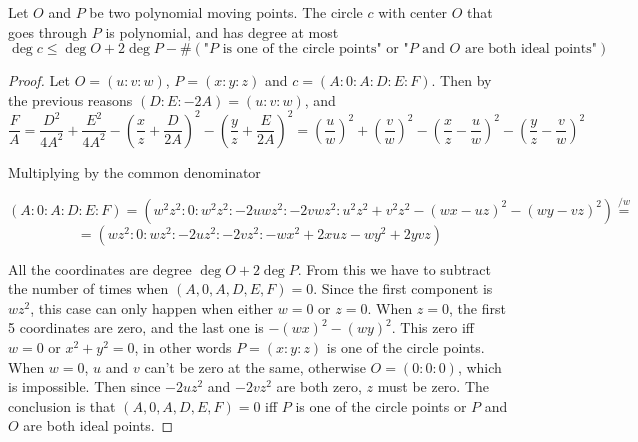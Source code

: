 \documentclass[a4paper]{article}
\begin{document}
\begin{theorem}
    Let $O$ and $P$ be two polynomial moving points. The circle $c$ with center $O$ that goes through $P$ is polynomial, and has degree at most
    $$\deg c\le \deg O+2\deg P-\#(\text{"$P$ is one of the circle points" or "$P$ and $O$ are both ideal points"})$$
\end{theorem}
\begin{proof}
    Let $O=(u:v:w)$, $P=(x:y:z)$ and $c=(A:0:A:D:E:F)$. Then by the previous reasons $(D:E:-2A)=(u:v:w)$, and
    $$\frac{F}{A}=\frac{D^2}{4A^2}+\frac{E^2}{4A^2}-\left(\frac{x}{z}+\frac{D}{2A}\right)^2-\left(\frac{y}{z}+\frac{E}{2A}\right)^2=\left(\frac{u}{w}\right)^2+\left(\frac{v}{w}\right)^2-\left(\frac{x}{z}-\frac{u}{w}\right)^2-\left(\frac{y}{z}-\frac{v}{w}\right)^2$$

Multiplying by the common denominator

$$(A:0:A:D:E:F)=(w^2z^2:0:w^2z^2:-2uwz^2:-2vwz^2:u^2z^2+v^2z^2-(wx-uz)^2-(wy-vz)^2)\overset{\text{/$w$}}{=}$$
$$=(wz^2:0:wz^2:-2uz^2:-2vz^2:-wx^2+2xuz-wy^2+2yvz)$$

All the coordinates are degree $\deg O+2\deg P$. From this we have to subtract the number of times when $(A,0,A,D,E,F)=0$. Since the first component is $wz^2$, this case can only happen when either $w=0$ or $z=0$. When $z=0$, the first 5 coordinates are zero, and the last one is $-(wx)^2-(wy)^2$. This zero iff $w=0$ or $x^2+y^2=0$, in other words $P=(x:y:z)$ is one of the circle points. When $w=0$, $u$ and $v$ can't be zero at the same, otherwise $O=(0:0:0)$, which is impossible. Then since $-2uz^2$ and $-2vz^2$ are both zero, $z$ must be zero.
The conclusion is that $(A,0,A,D,E,F)=0$ iff $P$ is one of the circle points or $P$ and $O$ are both ideal points.
\end{proof}
\end{document}

